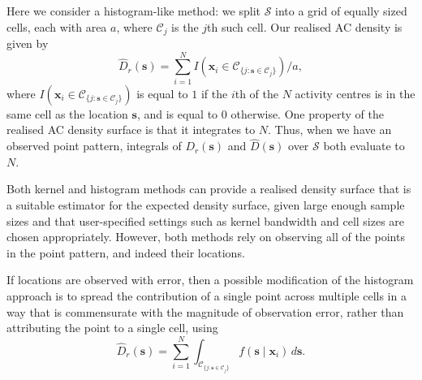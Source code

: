 \documentclass[useAMS,usenatbib,referee]{biom}
\begin{document}
Here we consider a histogram-like method: we split $\mathcal{S}$ into a grid of equally sized cells, each with area $a$, where $\mathcal{C}_j$ is the $j$th such cell. Our realised AC density is given by
\begin{equation}
\widehat{D}_r(\bm{s}) = \sum_{i = 1}^N I(\bm{x}_i \in \mathcal{C}_{\{j: \bm{s} \in \mathcal{C}_j\}})/a,
\end{equation}
where $I(\bm{x}_i \in \mathcal{C}_{\{j: \bm{s} \in \mathcal{C}_j\}})$ is equal to $1$ if the $i$th of the $N$ activity centres is in the same cell as the location $\bm{s}$, and is equal to $0$ otherwise. One property of the realised AC density surface is that it integrates to $N$. Thus, when we have an observed point pattern, integrals of $D_r(\bm{s})$ and $\widehat{D}(\bm{s})$ over $\mathcal{S}$ both evaluate to $N$.

Both kernel and histogram methods can provide a realised density surface that is a suitable estimator for the expected density surface, given large enough sample sizes and that user-specified settings such as kernel bandwidth and cell sizes are chosen appropriately. However, both methods rely on observing all of the points in the point pattern, and indeed their locations.

If locations are observed with error, then a possible modification of the histogram approach is to spread the contribution of a single point across multiple cells in a way that is commensurate with the magnitude of observation error, rather than attributing the point to a single cell, using
\begin{equation}
  \widehat{D}_r(\bm{s}) = \sum_{i = 1}^N \int_{\mathcal{C}_{\{j: \bm{s} \in \mathcal{C}_j\}}}  f(\bm{s} \mid \bm{x}_i) \, d\bm{s}. \label{eq:realised-D-error}
\end{equation}
\end{document}
